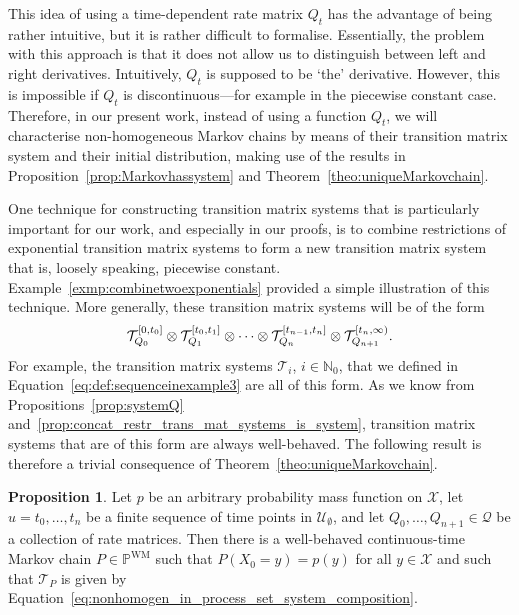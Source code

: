 \documentclass[10pt,a4paper]{paper}
\theoremstyle{definition}
\newtheorem{proposition}[theorem]{Proposition}
\newcommand{\nats}{\mathbb{N}}
\newcommand{\states}{\mathcal{X}}
\newcommand{\processes}{\mathbb{P}}
\newcommand{\wmprocesses}{\processes^{\mathrm{WM}}}
\newcommand{\rateset}{\mathcal{Q}}
\begin{document}
This idea of using a time-dependent rate matrix $Q_t$ has the advantage of being rather intuitive, but it is rather difficult to formalise. Essentially, the problem with this approach is that it does not allow us to distinguish between left and right derivatives. Intuitively, $Q_t$ is supposed to be `the' derivative. However, this is impossible if $Q_t$ is discontinuous---for example in the piecewise constant case. Therefore, in our present work, instead of using a function $Q_t$, we will characterise non-homogeneous Markov chains by means of their transition matrix system and their initial distribution, making use of the results in Proposition~\ref{prop:Markovhassystem} and Theorem~\ref{theo:uniqueMarkovchain}.

One technique for constructing transition matrix systems that is particularly important for our work, and especially in our proofs, is to combine restrictions of exponential transition matrix systems to form a new transition matrix system that is, loosely speaking, piecewise constant. Example~\ref{exmp:combinetwoexponentials} provided a simple illustration of this technique. More generally, these transition matrix systems will be of the form
\begin{equation}\label{eq:nonhomogen_in_process_set_system_composition}%
\mathcal{T}_{Q_0}^{[0,t_0]}\otimes \mathcal{T}_{Q_1}^{[t_0,t_1]} \otimes \cdots \otimes \mathcal{T}_{Q_n}^{[t_{n-1},t_n]} \otimes \mathcal{T}_{Q_{n+1}}^{[t_n,\infty)}.
\vspace{4pt}
\end{equation}
For example, the transition matrix systems $\mathcal{T}_i$, $i\in\nats_0$, that we defined in Equation~\eqref{eq:def:sequenceinexample3} are all of this form.
As we know from Propositions~\ref{prop:systemQ} and~\ref{prop:concat_restr_trans_mat_systems_is_system}, transition matrix systems that are of this form are always well-behaved. The following result is therefore a trivial consequence of Theorem~\ref{theo:uniqueMarkovchain}.

\begin{proposition}\label{prop:finite_different_rate_matrix_has_process}
Let $p$ be an arbitrary probability mass function on $\states$, let $u=t_0,\ldots,t_n$ be a finite sequence of time points in $\mathcal{U}_\emptyset$, and let $Q_0,\ldots,Q_{n+1}\in\rateset$ be a collection of rate matrices. Then there is a well-behaved continuous-time Markov chain $P\in\wmprocesses$ such that $P(X_0=y)=p(y)$ for all $y\in\mathcal{X}$ and such that $\mathcal{T}_P$ is given by Equation~\eqref{eq:nonhomogen_in_process_set_system_composition}.
\end{proposition}
\end{document}
